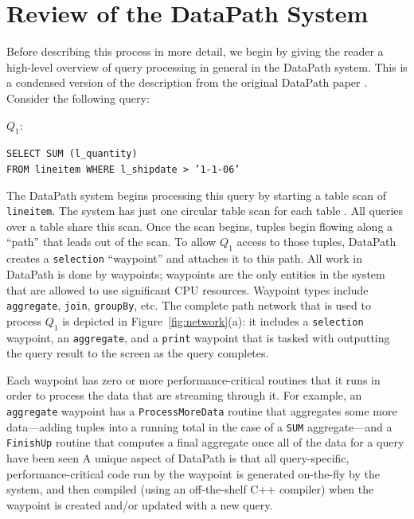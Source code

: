 \documentclass{sig-alternate}
\renewcommand\:{\colon} %
\begin{document}
\section{Review of the DataPath System}

Before describing this process in more detail, we begin by giving the reader a high-level overview of query processing in general in the 
DataPath system.
This is a condensed version of the description from the original DataPath paper \cite{}.
Consider the following query:

\vspace{5 pt} \noindent $Q_1$: \begin{small} \texttt{SELECT SUM (l\_quantity)}\\
\noindent \texttt{FROM lineitem WHERE l\_shipdate > '1-1-06'} \end{small}

\vspace{5 pt} \noindent 
The DataPath system begins processing this query by starting a table scan of
\texttt{lineitem}. The system has just one circular table scan for
each table \cite{HarizopoulosSA05}.  All queries over a table share this scan.
Once the scan begins, tuples begin flowing along a ``path'' that leads out of the 
scan.  To allow $Q_1$ access to those tuples, DataPath creates a 
\texttt{selection} ``waypoint'' and attaches it to this path.
All work in DataPath is done by waypoints; waypoints are the only entities in the
system that are allowed to use significant CPU resources.  
Waypoint types include
\texttt{aggregate}, \texttt{join}, \texttt{groupBy}, etc.
The complete path network that is used to process $Q_1$ is 
depicted in Figure~\ref{fig:network}(a): it includes a \texttt{selection} waypoint, 
an \texttt{aggregate}, and a \texttt{print} waypoint that is tasked with outputting the
query result to the screen as the query completes.

Each waypoint has zero or more performance-critical routines that it runs in order to
process the data that are streaming through it.  For example, an \texttt{aggregate}
waypoint has a \texttt{ProcessMoreData} routine that aggregates some more data---adding tuples into a running
total in the case of a \texttt{SUM} aggregate---and a
\texttt{FinishUp} routine that computes a final aggregate once all of the
data for a query have been seen
A unique aspect of DataPath is that
all query-specific,
performance-critical code run by the waypoint is generated on-the-fly by the system, and then
compiled (using an off-the-shelf C++ compiler) when the waypoint
is created and/or updated with a new query. 
\end{document}
